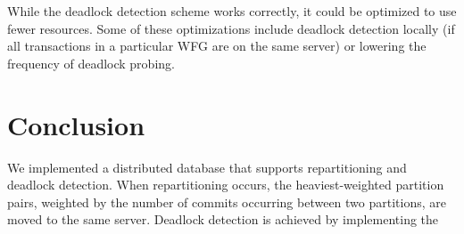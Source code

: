 \documentclass[a4paper, 10pt, notitlepage]{article}
\begin{document}
While the deadlock detection scheme works correctly, it could be optimized to use fewer resources. Some of these optimizations include deadlock detection locally (if all transactions in a particular WFG are on the same server) or lowering the frequency of deadlock probing.


\section{Conclusion}
We implemented a distributed database that supports repartitioning and deadlock detection. When repartitioning occurs, the heaviest-weighted partition pairs, weighted by the number of commits occurring between two partitions, are moved to the same server. Deadlock detection is achieved by implementing the 

\end{document}
